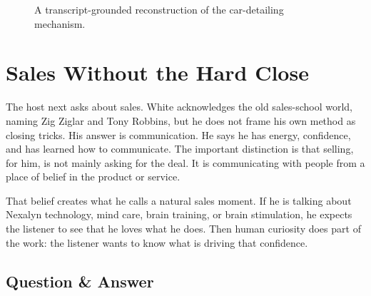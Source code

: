 \begin{figure}
\centering
{}
\caption{A transcript-grounded reconstruction of the car-detailing mechanism.}
\end{figure}

\section{Sales Without the Hard Close}

The host next asks about sales. White acknowledges the old sales-school world, naming Zig Ziglar and Tony Robbins, but he does not frame his own method as closing tricks. His answer is communication. He says he has energy, confidence, and has learned how to communicate. The important distinction is that selling, for him, is not mainly asking for the deal. It is communicating with people from a place of belief in the product or service.

That belief creates what he calls a natural sales moment. If he is talking about Nexalyn technology, mind care, brain training, or brain stimulation, he expects the listener to see that he loves what he does. Then human curiosity does part of the work: the listener wants to know what is driving that confidence.

\subsection{Question \& Answer}

